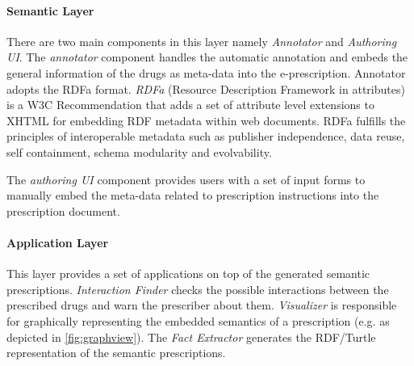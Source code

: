\documentclass[conference]{IEEEtran}
\begin{document}
\paragraph{Semantic Layer}
There are two main components in this layer namely \emph{Annotator} and \emph{Authoring UI}.
The \emph{annotator} component handles the automatic annotation and embeds the general information of the drugs as meta-data into the e-prescription.
Annotator adopts the RDFa format. \emph{RDFa} (Resource Description Framework in attributes) is a W3C Recommendation that adds a set of attribute level extensions to XHTML for embedding RDF metadata within web documents.
RDFa fulfills the principles of interoperable metadata such as publisher independence, data reuse, self containment, schema modularity and evolvability.

The \emph{authoring UI} component provides users with a set of input forms to manually embed the meta-data related to prescription instructions into the prescription document.

\paragraph{Application Layer}
This layer provides a set of applications on top of the generated semantic prescriptions.
\emph{Interaction Finder} checks the possible interactions between the prescribed drugs and warn the prescriber about them.
\emph{Visualizer} is responsible for graphically representing the embedded semantics of a prescription (e.g. as depicted in \autoref{fig:graphview}).
The \emph{Fact Extractor} generates the RDF/Turtle representation of the semantic prescriptions.
\end{document}
